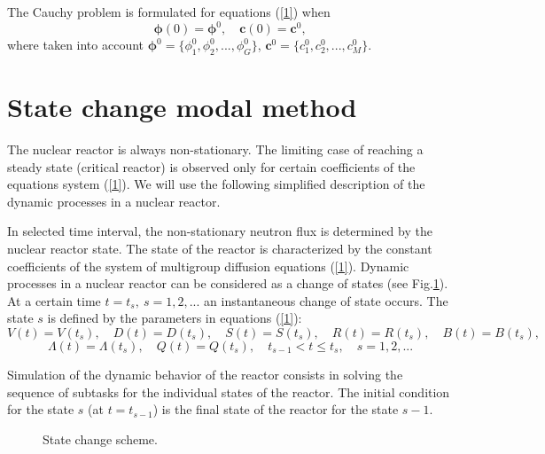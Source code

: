 \documentclass[a4paper]{jpconf}
\begin{document}
The Cauchy problem is formulated for equations (\ref{1})  when 
\begin{equation}\label{3}
 \bm \phi(0) = \bm \phi^0,
 \quad   \bm c(0) = \bm c^0,
\end{equation} 
where taken into account $\bm \phi^0 = \{ \phi_1^0,  \phi_2^0, ...,  \phi_G^0 \}$,  $\bm c^0 = \{c_1^0, c_2^0, ..., c_M^0\}$.

\section{State change modal method}
The nuclear reactor is always non-stationary. The limiting case of reaching a steady state (critical reactor) is observed only for certain coefficients of the equations system (\ref{1}). We will use the following simplified description of the dynamic processes in a nuclear reactor.

In selected time interval, the non-stationary neutron flux is determined by the nuclear reactor state. The state of the reactor is characterized by the constant coefficients of the system of multigroup diffusion equations (\ref{1}). Dynamic processes in a nuclear reactor can be considered as a change of states  (see  Fig.\ref{fig:1}). 
At a certain time $t = t_s, \ s = 1,2, ...$ an instantaneous change of state occurs. The state $s$ is defined by the parameters in equations  (\ref{1}):
\[
 V(t) = V(t_s), \quad  D(t) = D(t_s), \quad  S(t) = S(t_s), \quad  R(t) = R(t_s), \quad  B(t) = B(t_s),
\] 
\[
 \Lambda(t) = \Lambda(t_s), \quad  Q(t) = Q(t_s),
 \quad t_{s-1} < t \leq t_s, \quad s = 1,2, ... 
\] 


Simulation of the dynamic behavior of the reactor consists in solving the sequence of subtasks for the individual states of the reactor. The initial condition for the state $s$ (at $t = t_{s-1}$) is the final state of the reactor for the state $s-1$.

\begin{figure}[h] 
  \begin{center}
\vspace{5mm} 
    \caption{State change scheme.} 
   \label{fig:1}
  \end{center}
\end{figure}
\end{document}
